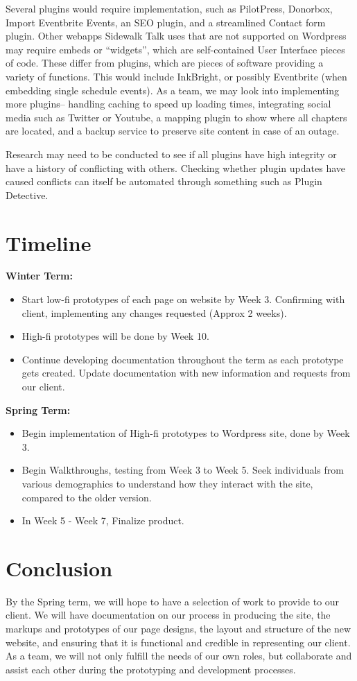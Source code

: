\documentclass[10pt, a4paper, technote, draftclsnofoot,onecolumn ]{IEEEtran}
\begin{document}
Several plugins would require implementation, such as PilotPress, Donorbox, Import Eventbrite Events, an SEO plugin, and a streamlined Contact form plugin. Other webapps Sidewalk Talk uses that are not supported on Wordpress may require embeds or “widgets”, which are self-contained User Interface pieces of code. These differ from plugins, which are pieces of software providing a variety of functions. This would include InkBright, or possibly Eventbrite (when embedding single schedule events). As a team, we may look into implementing more plugins-- handling caching to speed up loading times, integrating social media such as Twitter or Youtube, a mapping plugin to show where all chapters are located, and a backup service to preserve site content in case of an outage.

Research may need to be conducted to see if all plugins have high integrity or have a history of conflicting with others. Checking whether plugin updates have caused conflicts can itself be automated through something such as Plugin Detective.  

\section{Timeline}

\textbf{Winter Term:}
\begin{itemize}
\item Start low-fi prototypes of each page on website by Week 3. Confirming with client, implementing any changes requested (Approx 2 weeks). 
\item High-fi prototypes will be done by Week 10.
\item Continue developing documentation throughout the term as each prototype gets created. Update documentation with new information and requests from our client.
\end{itemize}
\textbf{Spring Term:}
\begin{itemize}
\item Begin implementation of High-fi prototypes to Wordpress site, done by Week 3. 
\item Begin Walkthroughs, testing from Week 3 to Week 5. Seek individuals from various demographics to understand how they interact with the site, compared to the older version.
\item In Week 5 - Week 7, Finalize product.
\end{itemize}



\section{Conclusion}

By the Spring term, we will hope to have a selection of work to provide to our client. We will have documentation on our process in producing the site, the markups and prototypes of our page designs, the layout and structure of the new website, and ensuring that it is functional and credible in representing our client. As a team, we will not only fulfill the needs of our own roles, but collaborate and assist each other during the prototyping and development processes. 
\end{document}
